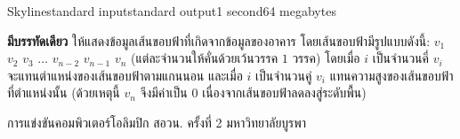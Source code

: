 \documentclass[11pt,a4paper]{article}
\begin{document}
\begin{problem}{Skyline}{standard input}{standard output}{1 second}{64 megabytes}
\OutputFile

\textbf{มีบรรทัดเดียว} ให้แสดงข้อมูลเส้นขอบฟ้าที่เกิดจากข้อมูลของอาคาร โดยเส้นขอบฟ้ามีรูปแบบดังนี้: $v_1$ $v_2$ $v_3$ $…$ $v_{n-2}$ $v_{n-1}$ $v_n$ (แต่ละจำนวนให้คั่นด้วยเว้นวรรค $1$ วรรค) โดยเมื่อ $i$ เป็นจำนวนคี่ $v_i$ จะแทนตำแหน่งของเส้นขอบฟ้าตามแกนนอน และเมื่อ $i$ เป็นจำนวนคู่ $v_i$ แทนความสูงของเส้นขอบฟ้าที่ตำแหน่งนั้น (ด้วยเหตุนี้ $v_n$ จึงมีค่าเป็น $0$ เนื่องจากเส้นขอบฟ้าลดลงสู่ระดับพื้น)
\Examples

\begin{example}
%
%
\end{example}

\Source

การแข่งขันคอมพิวเตอร์โอลิมปิก สอวน. ครั้งที่ 2 มหาวิทยาลัยบูรพา

\end{problem}
\end{document}
